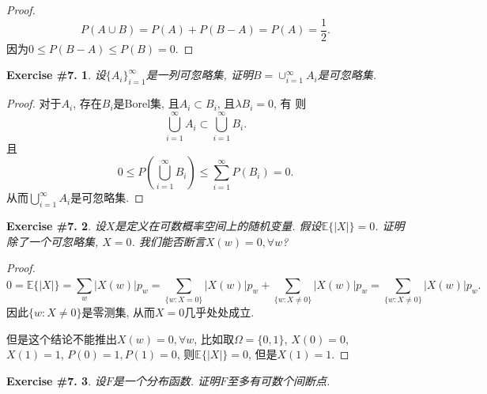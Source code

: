 \documentclass[UTF8, a4paper]{article}
\newtheorem{exercise}{Exercise \#7.}
\begin{document}
\begin{proof}
$$
P(A \cup B) = P(A) + P(B-A) = P(A) = \frac{1}{2}.
$$
因为\(0\leq P(B-A) \leq P(B) = 0\).
\end{proof}

\begin{framed}
\begin{exercise}
设\(\{A_i\}_{i=1}^\infty\)是一列可忽略集, 证明$B = \cup_{i=1}^\infty A_i$是可忽略集.
\end{exercise}
\end{framed}

\begin{proof}
对于\(A_i\), 存在\(B_i\)是Borel集, 且\(A_i \subset B_i\), 且\(\lambda B_i = 0\), 有
则
$$
\bigcup_{i=1}^\infty A_i \subset \bigcup_{i=1}^\infty B_i.
$$
且
$$
0 \leq P\left(\bigcup_{i=1}^\infty B_i\right) \leq \sum_{i=1}^\infty P(B_i) = 0.
$$
从而\(\bigcup_{i=1}^\infty A_i\)是可忽略集.
\end{proof}



\begin{framed}
\begin{exercise}
设\(X\)是定义在可数概率空间上的随机变量. 假设$\mathbb{E}\{|X|\} = 0$. 证明除了一个可忽略集, \(X = 0\). 我们能否断言\(X(w) = 0, \forall w\)?
\end{exercise}
\end{framed}

\begin{proof}
$$
0 = \mathbb{E}\{|X|\} = \sum_{w} |X(w)|p_w = \sum_{\{w: X = 0\}}^{} |X(w)|p_w + \sum_{\{w: X \neq 0\}}^{}|X(w)|p_w =  \sum_{\{w: X \neq 0\}}^{}|X(w)|p_w.
$$
因此\(\{w: X \neq 0\}\)是零测集, 从而\(X = 0\)几乎处处成立.

但是这个结论不能推出\(X(w) = 0, \forall w\), 
比如取\(\Omega = \{0, 1\}\), \(X(0) = 0\), \(X(1) = 1\), \(P(0) = 1, P(1) = 0\), 则\(\mathbb{E}\{|X|\} = 0\), 但是\(X(1) = 1\).

\end{proof}


\begin{framed}
\begin{exercise}
设$F$是一个分布函数. 证明$F$至多有可数个间断点.
\end{exercise}
\end{framed}
\end{document}
